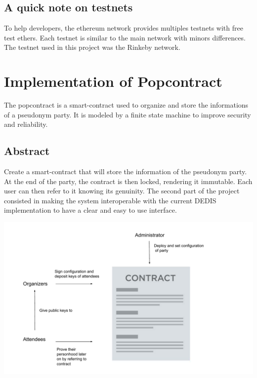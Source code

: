 \documentclass[11pt, a4paper, twoside, openright]{book} %
\begin{document}
\subsection{A quick note on testnets}
To help developers, the ethereum network provides multiples testnets with free test ethers. Each testnet is similar to the main network with minors differences. The testnet used in this project was the Rinkeby network.


\newpage



\section{Implementation of Popcontract}
The popcontract is a smart-contract used to organize and store the informations of a pseudonym party. It is modeled by a finite state machine to improve security and reliability.
\subsection{Abstract}
Create a smart-contract that will store the information of the pseudonym party. At the end of the party, the contract is then locked, rendering it immutable. Each user can then refer to it knowing its genuinity.
The second part of the project consisted in making the system interoperable with the current DEDIS implementation to have a clear and easy to use interface.   


  
\begin{minipage}{1\linewidth}
    \includegraphics[scale = 0.67]{popcontract.pdf}
\end{minipage}%
  
\end{document}
